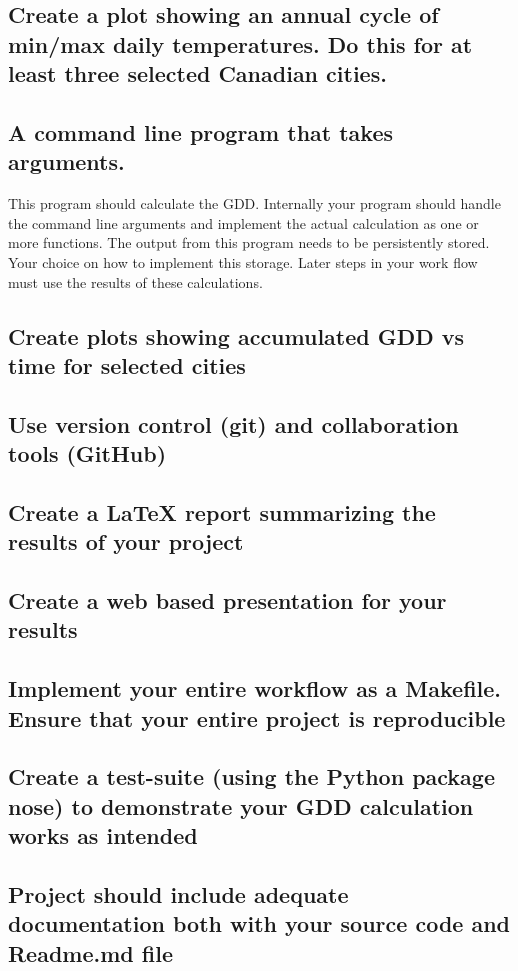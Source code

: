 \documentclass{article}
\begin{document}
\subsection{Create a plot showing an annual cycle of min/max daily temperatures. Do this for at least three selected Canadian cities.}
\subsection{A command line program that takes arguments.}
This program should calculate the GDD. Internally your program should handle the command line arguments and implement the actual calculation as one or more functions. The output from this program needs to be persistently stored. Your choice on how to implement this storage. Later steps in your work flow must use the results of these calculations.
\subsection{Create plots showing accumulated GDD vs time for selected cities}

\subsection{Use version control (git) and collaboration tools (GitHub)}
\subsection{Create a LaTeX report summarizing the results of your project}
\subsection{Create a web based presentation for your results}
\subsection{Implement your entire workflow as a Makefile. Ensure that your entire project is reproducible}
\subsection{Create a test-suite (using the Python package nose) to demonstrate your GDD calculation works as intended}
\subsection{Project should include adequate documentation both with your source code and Readme.md file}
\end{document}
